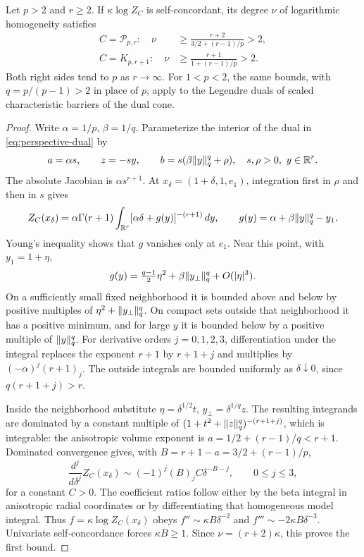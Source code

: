 \begin{theorem}
\label{thm:characteristic-obstruction}
Let $p>2$ and $r\geq2$. If $\kappa\log Z_C$ is self-concordant, its
degree $\nu$ of logarithmic homogeneity satisfies
\begin{align}
 C=\mathcal P_{p,r}:\quad
 \nu&\geq\frac{r+2}{3/2+(r-1)/p}>2,
 \label{eq:grouped-characteristic-bound}\\
 C=K_{p,r+1}:\quad
 \nu&\geq\frac{r+1}{1+(r-1)/p}>2.
 \label{eq:norm-characteristic-bound}
\end{align}
Both right sides tend to $p$ as $r\to\infty$. For $1<p<2$, the same
bounds, with $q=p/(p-1)>2$ in place of $p$, apply to the Legendre duals
of scaled characteristic barriers of the dual cone.
\end{theorem}
\begin{proof}
Write $\alpha=1/p$, $\beta=1/q$. Parameterize the interior of the dual
in \eqref{eq:perspective-dual} by
\[
 a=\alpha s,\qquad z=-sy,\qquad
 b=s(\beta\lVert y\rVert_q^q+\rho),\quad s,\rho>0,\ y\in\mathbb R^r.
\]
The absolute Jacobian is $\alpha s^{r+1}$. At
$x_\delta=(1+\delta,1,e_1)$, integration first in $\rho$ and then in
$s$ gives
\begin{equation}\label{eq:grouped-characteristic-integral}
 Z_C(x_\delta)=\alpha\Gamma(r+1)
 \int_{\mathbb R^r}[\alpha\delta+g(y)]^{-(r+1)}\,dy,
 \qquad g(y)=\alpha+\beta\lVert y\rVert_q^q-y_1.
\end{equation}
Young's inequality shows that $g$ vanishes only at $e_1$. Near this
point, with $y_1=1+\eta$,
\[
 g(y)=\tfrac{q-1}{2}\eta^2+\beta\lVert y_\perp\rVert_q^q+O(|\eta|^3).
\]
On a sufficiently small fixed neighborhood it is bounded above and
below by positive multiples of $\eta^2+\lVert y_\perp\rVert_q^q$.
On compact sets outside that neighborhood it has a positive minimum,
and for large $y$ it is bounded below by a positive multiple of
$\lVert y\rVert_q^q$. For derivative orders $j=0,1,2,3$, differentiation
under the integral replaces the exponent $r+1$ by $r+1+j$ and
multiplies by $(-\alpha)^j(r+1)_j$. The outside integrals are bounded
uniformly as $\delta\downarrow0$, since $q(r+1+j)>r$.

Inside the neighborhood substitute
$\eta=\delta^{1/2}t$, $y_\perp=\delta^{1/q}z$.
The resulting integrands are dominated by a constant multiple of
$(1+t^2+\lVert z\rVert_q^q)^{-(r+1+j)}$, which is integrable: the anisotropic
volume exponent is $a=1/2+(r-1)/q<r+1$.
Dominated convergence gives, with $B=r+1-a=3/2+(r-1)/p$,
\begin{equation}\label{eq:characteristic-differentiated}
 \frac{d^j}{d\delta^j}Z_C(x_\delta)
 \sim(-1)^j(B)_j C\delta^{-B-j},\qquad 0\leq j\leq3,
\end{equation}
for a constant $C>0$. The coefficient ratios follow either by the beta
integral in anisotropic radial coordinates or by differentiating that
homogeneous model integral. Thus $f=\kappa\log Z_C(x_\delta)$ obeys
$f''\sim\kappa B\delta^{-2}$ and
$f'''\sim-2\kappa B\delta^{-3}$. Univariate self-concordance forces
$\kappa B\geq1$. Since $\nu=(r+2)\kappa$, this proves the first bound.


\end{proof}
